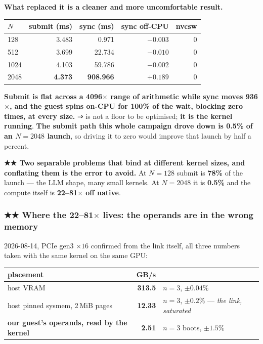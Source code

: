 \documentclass[10.5pt]{article}
\begin{document}
\textbf{What replaced it is a cleaner and more uncomfortable result.}

\begin{center}\small
\begin{tabular}{@{}lrrrr@{}}
\toprule
$N$ & \textbf{submit (ms)} & \textbf{sync (ms)} & \textbf{sync off-CPU} & \textbf{nvcsw} \\
\midrule
128 & 3.483 & 0.971 & $-0.003$ & 0 \\
512 & 3.699 & 22.734 & $-0.010$ & 0 \\
1024 & 4.103 & 59.786 & $-0.002$ & 0 \\
2048 & \textbf{4.373} & \textbf{908.966} & $+0.189$ & 0 \\
\bottomrule
\end{tabular}
\end{center}

\textbf{Submit is flat across a 4096$\times$ range of arithmetic while sync moves 936$\times$, and
the guest spins on-CPU for 100\% of the wait, blocking zero times, at every size.}
⇒  is not a floor to be optimised; \textbf{it is the kernel running}.
\textbf{The submit path this whole campaign drove down is 0.5\% of an $N=2048$ launch}, so driving
it to zero would improve that launch by half a percent.

\smallskip
\textbf{★★ Two separable problems that bind at different kernel sizes, and conflating them is the
error to avoid.} At $N=128$ submit is \textbf{78\%} of the launch — the LLM shape, many small
kernels. At $N=2048$ it is \textbf{0.5\%} and the compute itself is \textbf{22--81$\times$ off
native}.

\subsubsection*{★★ Where the 22--81$\times$ lives: the operands are in the wrong memory}

\measured{} 2026-08-14, PCIe gen3 $\times 16$ confirmed from the link itself, all three numbers
taken with the same kernel on the same GPU:

\begin{center}\small
\begin{tabular}{@{}lrl@{}}
\toprule
\textbf{placement} & \textbf{GB/s} & \\
\midrule
host VRAM & \textbf{313.5} & $n=3$, $\pm 0.04\%$ \\
host pinned sysmem, 2\,MiB pages & \textbf{12.33} & $n=3$, $\pm 0.2\%$ — \emph{the link,
  saturated} \\
\textbf{our guest's operands, read by the kernel} & \textbf{2.51} & $n=3$ boots, $\pm 1.5\%$ \\
\bottomrule
\end{tabular}
\end{center}
\end{document}
